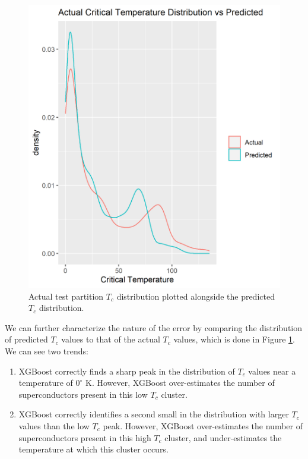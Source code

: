 \documentclass[oneside,12pt]{amsart}
\begin{document}
\begin{figure}
    \centering
    \includegraphics{Actual_vs_Pred_dist.png}
    \caption{Actual test partition $T_c$ distribution plotted alongside the predicted $T_c$ distribution. }
    \label{fig:actual_vs_pred_Tc_dist}
\end{figure}
 
 We can further characterize the nature of the error by comparing the distribution of predicted $T_c$ values to that of the actual $T_c$ values, which is done in Figure \ref{fig:actual_vs_pred_Tc_dist}. We can see two trends:
 \newpage
 \begin{enumerate}
     \item XGBoost correctly finds a sharp peak in the distribution of $T_c$ values near a temperature of $0^\circ$ K. However, XGBoost over-estimates the number of superconductors present in this low $T_c$ cluster.
     \item XGBoost correctly identifies a second small in the distribution with larger $T_c$ values than the low $T_c$ peak. However, XGBoost over-estimates the number of superconductors present in this high $T_c$ cluster, and under-estimates the temperature at which this cluster occurs.
 \end{enumerate}
 
\end{document}
